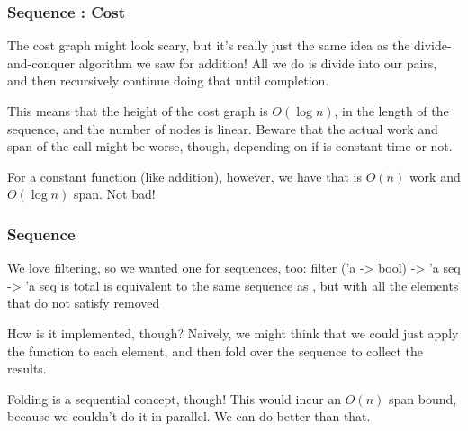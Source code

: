 \documentclass[aspectratio=169]{beamer}
\begin{document}
\begin{frame}[fragile]
\begin{center}
  \end{center}
\end{frame}

\begin{frame}[fragile]
  \frametitle{Sequence : Cost}

  The cost graph might look scary, but it's really just the same idea as the
  divide-and-conquer algorithm we saw for addition! All we do is divide into
  our pairs, and then recursively continue doing that until completion.

  \pause
  \vspace{\fill}

  This means that the height of the cost graph is $O(\log n)$, in the length
  of the sequence, and the number of nodes is linear. Beware that the actual
  work and span of the  call might be worse, though, depending
  on if  is constant time or not.

  \pause
  \vspace{\fill}

  For a constant function  (like addition), however, we have that
   is $O(n)$ work and $O(\log n)$ span. Not bad!
\end{frame}

\begin{frame}[fragile]
  \frametitle{Sequence }

  We love filtering, so we wanted one for sequences, too:
  \pause
  \spec
    {filter}
    {('a -> bool) -> 'a seq -> 'a seq}
    { is total}
    { is equivalent to the same sequence as , but
    with all the elements that do not satisfy  removed}

  \pause
  How is it implemented, though? Naively, we might think that we could just
  apply the function  to each element, and then fold over the sequence
  to collect the results.

  \pause
  \vspace{\fill}

  Folding is a sequential concept, though! This would incur an $O(n)$ span
  bound, because we couldn't do it in parallel. We can do better than that.
\end{frame}
\end{document}
